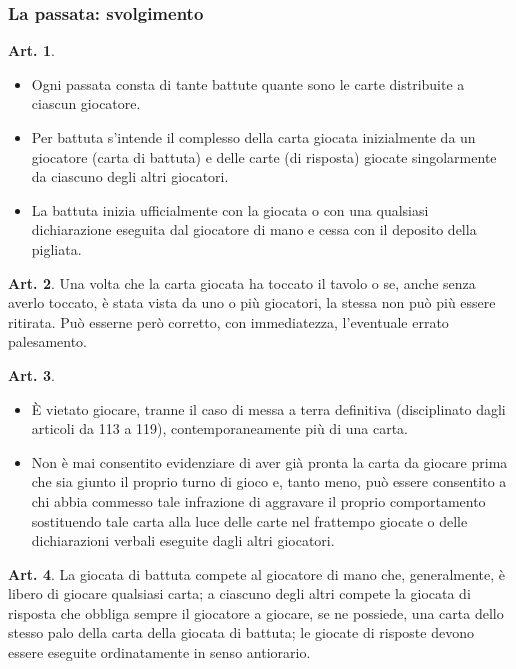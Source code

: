 \documentclass[italian,a4paper]{article}
\theoremstyle{definition}
\newtheorem{art}{Art.}
\newenvironment{packeditem}{
\begin{itemize}
  \setlength{\itemsep}{1pt}
  \setlength{\parskip}{0pt}
  \setlength{\parsep}{0pt}
}{\end{itemize}}
\begin{document}
\subsubsection{La passata: svolgimento}
\begin{art} \hspace*{\fill}
    \begin{packeditem}
\item Ogni passata consta di tante battute quante sono le carte distribuite a ciascun giocatore.
\item Per battuta s'intende il complesso della carta giocata inizialmente da un giocatore (carta di battuta) e delle carte (di risposta) giocate singolarmente da ciascuno degli altri giocatori.
\item La battuta inizia ufficialmente con la giocata o con una qualsiasi dichiarazione eseguita dal giocatore di mano e cessa con il deposito della pigliata.
    \end{packeditem}
\end{art}
\begin{art}
    Una volta che la carta giocata ha toccato il tavolo o se, anche senza averlo toccato, è stata vista da uno o più giocatori, la stessa non può più essere ritirata. Può esserne però corretto, con immediatezza, l'eventuale errato palesamento.
\end{art}
\begin{art}   \hspace*{\fill}
    \begin{packeditem}
\item \`E vietato giocare, tranne il caso di messa a terra definitiva (disciplinato dagli articoli da 113 a 119), contemporaneamente più di una carta.
\item Non è mai consentito evidenziare di aver già pronta la carta da giocare prima che sia giunto il proprio turno di gioco e, tanto meno, può essere consentito a chi abbia commesso tale infrazione di aggravare il proprio comportamento sostituendo tale carta alla luce delle carte nel frattempo giocate o delle dichiarazioni verbali eseguite dagli altri giocatori.
    \end{packeditem}
\end{art}
\begin{art}
    La giocata di battuta compete al giocatore di mano che, generalmente, è libero di giocare qualsiasi carta; a ciascuno degli altri compete la giocata di risposta che obbliga sempre il giocatore a giocare, se ne possiede, una carta dello stesso palo della carta della giocata di battuta; le giocate di risposte devono essere eseguite ordinatamente in senso antiorario.
\end{art}
\end{document}
